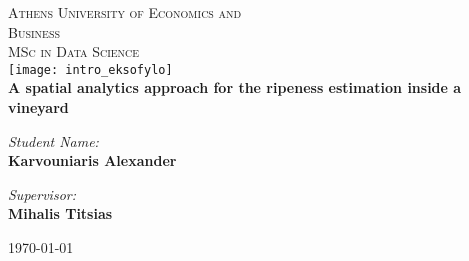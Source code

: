\documentclass[12pt,a4paper,oneside]{book}
\theoremstyle{plain}
\theoremstyle{definition}
\begin{document}
{\selectfont
\begin{titlepage}
\begin{center}
\textsc{\LARGE Athens University of Economics and \\
\vspace{4mm} Business}\\[0.5cm]


\textsc{\LARGE MSc in Data Science}\\[0.6cm]
\texttt{[image: intro\_eksofylo]}
\textsc{\Large }\\[0.2cm]
{ \huge \bfseries A spatial analytics approach for the ripeness estimation inside a vineyard \\[0.4cm] }
\vspace{30mm}

\noindent
\begin{minipage}{0.4\textwidth}
\begin{flushleft} \large
\emph{Student Name:} \\
\textbf{Karvouniaris Alexander}
\end{flushleft}
\end{minipage}%
\begin{minipage}{0.4\textwidth}
\begin{flushright} \large
\emph{Supervisor:} \\
\textbf{Mihalis Titsias}
\end{flushright}
\end{minipage}

\vfill

{\large \today}

\end{center}
\end{titlepage}
}
\end{document}
